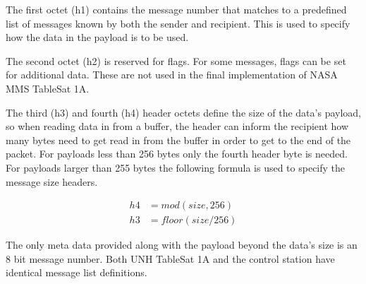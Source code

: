 The first octet (h1) contains the message number that matches to a predefined list of messages known by both the sender and recipient.  This is used to specify how the data in the payload is to be used.

The second octet (h2) is reserved for flags.  For some messages, flags can be set for additional data.  These are not used in the final implementation of NASA MMS TableSat 1A.

The third (h3) and fourth (h4) header octets define the size of the data's payload, so when reading data in from a buffer, the header can inform the recipient how many bytes need to get read in from the buffer in order to get to the end of the packet.  For payloads less than 256 bytes only the fourth header byte is needed.  For payloads larger than 255 bytes the following formula is used to specify the message size headers.

\begin{subequations}
  \begin{align}
    h4 &= mod(size, 256) \\
    h3 &= floor(size / 256)
  \end{align}
  \label{eqn:UDPSizeHeader}
\end{subequations}

The only meta data provided along with the payload beyond the data's size is an 8 bit message number.  Both UNH TableSat 1A and the control station have identical message list definitions.

